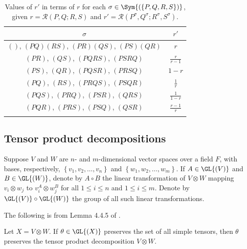 \begin{table}
\renewcommand*{\arraystretch}{1.6}
\centering
\begin{tabular}{cc}
\hline
$\sigma$ & $r'$ \\
\hline
$\left(\right)$, ${\left(PQ \right)} {\left(RS \right)}$, ${\left(PR \right)} {\left(QS \right)}$, ${\left(PS \right)} {\left(QR \right)}$ & $r$ \\
$\left(PR \right)$, $\left(QS \right)$, $\left(PQRS \right)$, $\left(PSRQ \right)$ & $\frac{r}{r-1}$ \\
$\left(PS \right)$, $\left(QR \right)$, $\left(PQSR \right)$, $\left(PRSQ \right)$ & $1-r$ \\
$\left(PQ \right)$, $\left(RS \right)$, $\left(PRQS \right)$, $\left(PSQR \right)$ & $\frac{1}{r}$ \\
$\left(PQS \right)$, $\left(PRQ \right)$, $\left(PSR \right)$, $\left(QRS \right)$ & $\frac{1}{1-r}$ \\
$\left(PQR \right)$, $\left(PRS \right)$, $\left(PSQ \right)$, $\left(QSR \right)$ & $\frac{r-1}{r}$ \\
\hline \\
\end{tabular}
\caption{Values of $r'$ in terms of $r$ for each $\sigma \in \Sym{\left(\left\{P, Q, R, S \right\}\right)}$, given $r = \mathcal{R}{\left(P, Q; R, S \right)}$ and $r' = \mathcal{R}{\left(P^\sigma, Q^\sigma; R^\sigma, S^\sigma \right)}$.}
\label{tbl:permuted-cross-ratios}
\end{table}

\subsection{Tensor product decompositions}

Suppose $V$ and $W$ are $n$- and $m$-dimensional vector spaces over a field $F$, with bases, respectively, $\left\{v_1, v_2, \ldots, v_n \right\}$ and $\left\{w_1, w_2, \ldots, w_m \right\}$. If $A \in \GL{\left(V \right)}$ and $B \in \GL{\left(W \right)}$, denote by $A \circ B$ the linear transformation of $V \otimes W$ mapping $v_i \otimes w_j$ to $v_i^A \otimes w_j^B$ for all $1 \leqslant i \leqslant n$ and $1 \leqslant i \leqslant m$. Denote by $\GL{\left(V \right)} \circ \GL{\left(W \right)}$ the group of all such linear transformations.

The following is from Lemma 4.4.5 of \cite{ref:xu-aschbacher}.

\begin{lemma} \label{lm:preserves-simple-tensors-preserves-decomp}
Let $X = V \otimes W$. If $\theta \in \GL{\left(X \right)}$ preserves the set of all simple tensors, then $\theta$ preserves the tensor product decomposition $V \otimes W$.
\end{lemma}

